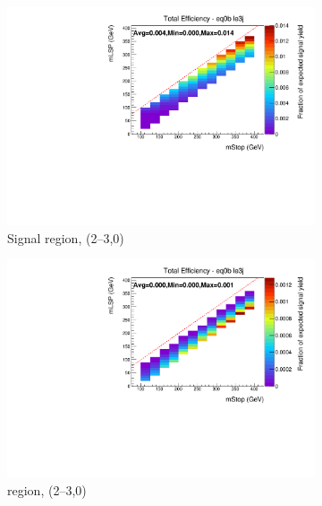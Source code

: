 \begin{figure}[ht!]
  \centering
  \begin{subfigure}[b]{0.47\textwidth}
    \includegraphics[width=\textwidth, trim=0 0 0 24, clip=true]{Figs/sms/t2degen/v5/T2_4body_v5_had_eff_maps_eq0b_le3j_SITV.pdf}
    \caption{Signal region, (2--3,0)}
    \label{fig:t2_4body_sig_eff_le3j_0b}
  \end{subfigure}
  \begin{subfigure}[b]{0.47\textwidth}
    \includegraphics[width=\textwidth, trim=0 0 0 24, clip=true]{Figs/sms/t2degen/v5/T2_4body_v5_muon_eff_maps_eq0b_le3j_SITV.pdf}
    \caption{\mj region, (2--3,0)}
    \label{fig:t2_4body_mu_eff_le3j_0b}
  \end{subfigure} \\
  \begin{subfigure}[b]{0.47\textwidth}

\end{subfigure}
\end{figure}
